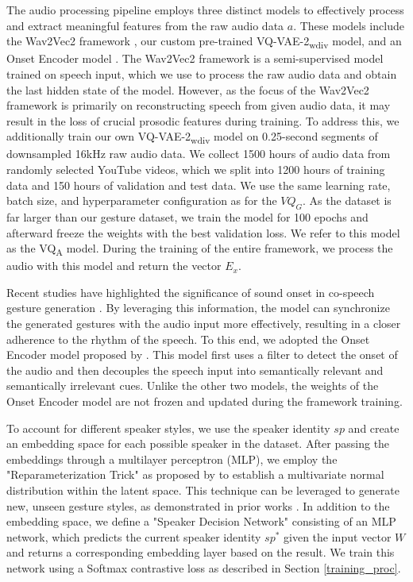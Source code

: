 \documentclass[sigconf]{acmart}
\begin{document}
The audio processing pipeline employs three distinct models to effectively process and extract meaningful features from the raw audio data $a$. These models include the Wav2Vec2 framework \cite{baevskiWav2vecFrameworkSelfSupervised2020}, our custom pre-trained VQ-VAE-2\textsubscript{wdiv} model, and an Onset Encoder model \cite{liangSEEGSemanticEnergized2022}.
The Wav2Vec2 framework is a semi-supervised model trained on speech input, which we use to process the raw audio data and obtain the last hidden state of the model. However, as the focus of the Wav2Vec2 framework is primarily on reconstructing speech from given audio data, it may result in the loss of crucial prosodic features during training. To address this, we additionally train our own VQ-VAE-2\textsubscript{wdiv} model on 0.25-second segments of downsampled 16kHz raw audio data. We collect 1500 hours of audio data from randomly selected YouTube videos, which we split into 1200 hours of training data and 150 hours of validation and test data. We use the same learning rate, batch size, and hyperparameter configuration as for the $VQ_G$. As the dataset is far larger than our gesture dataset, we train the model for 100 epochs and afterward freeze the weights with the best validation loss. We refer to this model as the VQ\textsubscript{A} model. During the training of the entire framework, we process the audio with this model and return the vector $E_x$.

Recent studies have highlighted the significance of sound onset in co-speech gesture generation \cite{liangSEEGSemanticEnergized2022,aoRhythmicGesticulatorRhythmAware2022a}. By leveraging this information, the model can synchronize the generated gestures with the audio input more effectively, resulting in a closer adherence to the rhythm of the speech. To this end, we adopted the Onset Encoder model proposed by \citet{liangSEEGSemanticEnergized2022}. This model first uses a filter to detect the onset of the audio and then decouples the speech input into semantically relevant and semantically irrelevant cues. Unlike the other two models, the weights of the Onset Encoder model are not frozen and updated during the framework training. 

To account for different speaker styles, we use the speaker identity $sp$ and create an embedding space for each possible speaker in the dataset. After passing the embeddings through a multilayer perceptron (MLP), we employ the "Reparameterization Trick" as proposed by \citet{kingma2013auto} to establish a multivariate normal distribution within the latent space. This technique can be leveraged to generate new, unseen gesture styles, as demonstrated in prior works  \citep{ahujaStyleTransferCoSpeech2020,ghorbani2022exemplar}.
In addition to the embedding space, we define a "Speaker Decision Network" consisting of an MLP network, which predicts the current speaker identity $sp^*$ given the input vector $W$ and returns a corresponding embedding layer based on the result. We train this network using a Softmax contrastive loss as described in Section \ref{training_proc}.
\end{document}
